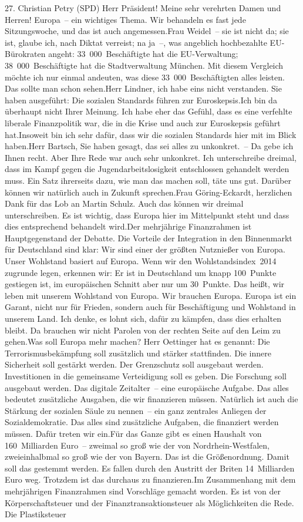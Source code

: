 \documentclass{article}
\begin{document}
	27. Christian Petry (SPD) Herr Präsident! Meine sehr verehrten Damen und Herren! Europa – ein wichtiges Thema. Wir behandeln es fast jede Sitzungswoche, und das ist auch angemessen.Frau Weidel – sie ist nicht da; sie ist, glaube ich, nach Diktat verreist; na ja –, was angeblich hochbezahlte EU-Bürokraten angeht: 33 000 Beschäftigte hat die EU-Verwaltung; 38 000 Beschäftigte hat die Stadtverwaltung München. Mit diesem Vergleich möchte ich nur einmal andeuten, was diese 33 000 Beschäftigten alles leisten. Das sollte man schon sehen.Herr Lindner, ich habe eins nicht verstanden. Sie haben ausgeführt: Die sozialen Standards führen zur Euroskepsis.Ich bin da überhaupt nicht Ihrer Meinung. Ich habe eher das Gefühl, dass es eine verfehlte liberale Finanzpolitik war, die in die Krise und auch zur Euroskepsis geführt hat.Insoweit bin ich sehr dafür, dass wir die sozialen Standards hier mit im Blick haben.Herr Bartsch, Sie haben gesagt, das sei alles zu unkonkret. – Da gebe ich Ihnen recht. Aber Ihre Rede war auch sehr unkonkret. Ich unterschreibe dreimal, dass im Kampf gegen die Jugendarbeitslosigkeit entschlossen gehandelt werden muss. Ein Satz ihrerseits dazu, wie man das machen soll, täte uns gut. Darüber können wir natürlich auch in Zukunft sprechen.Frau Göring-Eckardt, herzlichen Dank für das Lob an Martin Schulz. Auch das können wir dreimal unterschreiben. Es ist wichtig, dass Europa hier im Mittelpunkt steht und dass dies entsprechend behandelt wird.Der mehrjährige Finanzrahmen ist Hauptgegenstand der Debatte. Die Vorteile der Integration in den Binnenmarkt für Deutschland sind klar: Wir sind einer der größten Nutznießer von Europa. Unser Wohlstand basiert auf Europa. Wenn wir den Wohlstandsindex 2014 zugrunde legen, erkennen wir: Er ist in Deutschland um knapp 100 Punkte gestiegen ist, im europäischen Schnitt aber nur um 30 Punkte. Das heißt, wir leben mit unserem Wohlstand von Europa. Wir brauchen Europa. Europa ist ein Garant, nicht nur für Frieden, sondern auch für Beschäftigung und Wohlstand in unserem Land. Ich denke, es lohnt sich, dafür zu kämpfen, dass dies erhalten bleibt. Da brauchen wir nicht Parolen von der rechten Seite auf den Leim zu gehen.Was soll Europa mehr machen? Herr Oettinger hat es genannt: Die Terrorismusbekämpfung soll zusätzlich und stärker stattfinden. Die innere Sicherheit soll gestärkt werden. Der Grenzschutz soll ausgebaut werden. Investitionen in die gemeinsame Verteidigung soll es geben. Die Forschung soll ausgebaut werden. Das digitale Zeitalter – eine europäische Aufgabe. Das alles bedeutet zusätzliche Ausgaben, die wir finanzieren müssen. Natürlich ist auch die Stärkung der sozialen Säule zu nennen – ein ganz zentrales Anliegen der Sozialdemokratie. Das alles sind zusätzliche Aufgaben, die finanziert werden müssen. Dafür treten wir ein.Für das Ganze gibt es einen Haushalt von 160 Milliarden Euro – zweimal so groß wie der von Nordrhein-Westfalen, zweieinhalbmal so groß wie der von Bayern. Das ist die Größenordnung. Damit soll das gestemmt werden. Es fallen durch den Austritt der Briten 14 Milliarden Euro weg. Trotzdem ist das durchaus zu finanzieren.Im Zusammenhang mit dem mehrjährigen Finanzrahmen sind Vorschläge gemacht worden. Es ist von der Körperschaftsteuer und der Finanztransaktionsteuer als Möglichkeiten die Rede. Die Plastiksteuer 
\end{document}
